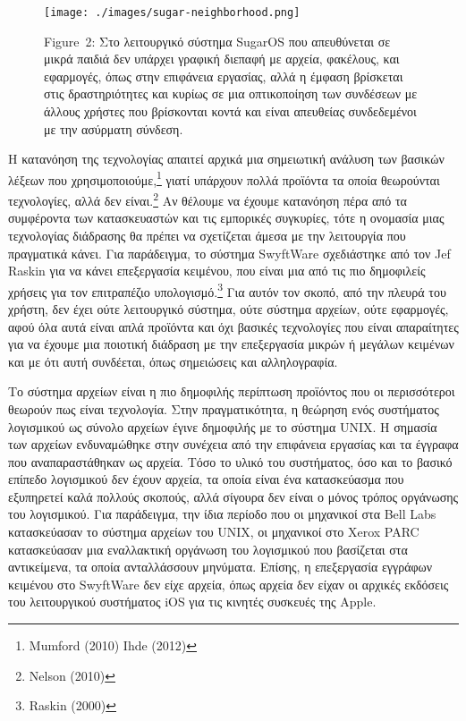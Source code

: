 \documentclass[
]{article}
\begin{document}
\leavevmode{}%
\begin{figure}
\hypertarget{fig:sugar-neighborhood}{%
\centering
\texttt{[image: ./images/sugar-neighborhood.png]}
\caption{Figure~2: Στο λειτουργικό σύστημα SugarOS που απευθύνεται σε
μικρά παιδιά δεν υπάρχει γραφική διεπαφή με αρχεία, φακέλους, και
εφαρμογές, όπως στην επιφάνεια εργασίας, αλλά η έμφαση βρίσκεται στις
δραστηριότητες και κυρίως σε μια οπτικοποίηση των συνδέσεων με άλλους
χρήστες που βρίσκονται κοντά και είναι απευθείας συνδεδεμένοι με την
ασύρματη σύνδεση.}\label{fig:sugar-neighborhood}
}
\end{figure}

Η κατανόηση της τεχνολογίας απαιτεί αρχικά μια σημειωτική ανάλυση των
βασικών λέξεων που χρησιμοποιούμε,\footnote{Mumford (2010) Ihde (2012)}
γιατί υπάρχουν πολλά προϊόντα τα οποία θεωρούνται τεχνολογίες, αλλά δεν
είναι.\footnote{Nelson (2010)} Αν θέλουμε να έχουμε κατανόηση πέρα από
τα συμφέροντα των κατασκευαστών και τις εμπορικές συγκυρίες, τότε η
ονομασία μιας τεχνολογίας διάδρασης θα πρέπει να σχετίζεται άμεσα με την
λειτουργία που πραγματικά κάνει. Για παράδειγμα, το σύστημα SwyftWare
σχεδιάστηκε από τον Jef Raskin για να κάνει επεξεργασία κειμένου, που
είναι μια από τις πιο δημοφιλείς χρήσεις για τον επιτραπέζιο
υπολογισμό.\footnote{Raskin (2000)} Για αυτόν τον σκοπό, από την πλευρά
του χρήστη, δεν έχει ούτε λειτουργικό σύστημα, ούτε σύστημα αρχείων,
ούτε εφαρμογές, αφού όλα αυτά είναι απλά προϊόντα και όχι βασικές
τεχνολογίες που είναι απαραίτητες για να έχουμε μια ποιοτική διάδραση με
την επεξεργασία μικρών ή μεγάλων κειμένων και με ότι αυτή συνδέεται,
όπως σημειώσεις και αλληλογραφία.

Το σύστημα αρχείων είναι η πιο δημοφιλής περίπτωση προϊόντος που οι
περισσότεροι θεωρούν πως είναι τεχνολογία. Στην πραγματικότητα, η
θεώρηση ενός συστήματος λογισμικού ως σύνολο αρχείων έγινε δημοφιλής με
το σύστημα UNIX. Η σημασία των αρχείων ενδυναμώθηκε στην συνέχεια από
την επιφάνεια εργασίας και τα έγγραφα που αναπαραστάθηκαν ως αρχεία.
Τόσο το υλικό του συστήματος, όσο και το βασικό επίπεδο λογισμικού δεν
έχουν αρχεία, τα οποία είναι ένα κατασκεύασμα που εξυπηρετεί καλά
πολλούς σκοπούς, αλλά σίγουρα δεν είναι ο μόνος τρόπος οργάνωσης του
λογισμικού. Για παράδειγμα, την ίδια περίοδο που οι μηχανικοί στα Bell
Labs κατασκεύασαν το σύστημα αρχείων του UNIX, οι μηχανικοί στο Xerox
PARC κατασκεύασαν μια εναλλακτική οργάνωση του λογισμικού που βασίζεται
στα αντικείμενα, τα οποία ανταλλάσσουν μηνύματα. Επίσης, η επεξεργασία
εγγράφων κειμένου στο SwyftWare δεν είχε αρχεία, όπως αρχεία δεν είχαν
οι αρχικές εκδόσεις του λειτουργικού συστήματος iOS για τις κινητές
συσκευές της Apple.
\end{document}
